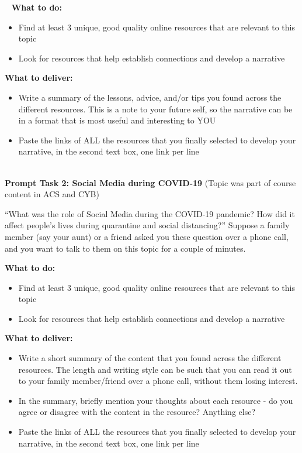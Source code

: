 \documentclass[letterpaper, nobind]{templates/ociamthesis}
\begin{document}
~
\textbf{What to do:}

\begin{itemize}
\item
  Find at least 3 unique, good quality online resources that are
  relevant to this topic
\item
  Look for resources that help establish connections and develop a
  narrative
\end{itemize}

\textbf{What to deliver:}

\begin{itemize}
\item
  Write a summary of the lessons, advice, and/or tips you found across
  the different resources. This is a note to your future self, so the
  narrative can be in a format that is most useful and interesting to
  YOU
\item
  Paste the links of ALL the resources that you finally selected to
  develop your narrative, in the second text box, one link per line
\end{itemize}

~\\
\textbf{Prompt Task 2: Social Media during COVID-19} (Topic was part of course
content in ACS and CYB)

``What was the role of Social Media during the COVID-19 pandemic? How did
it affect people's lives during quarantine and social distancing?''
Suppose a family member (say your aunt) or a friend asked you these
question over a phone call, and you want to talk to them on this topic
for a couple of minutes.

\textbf{What to do:}

\begin{itemize}
\item
  Find at least 3 unique, good quality online resources that are
  relevant to this topic
\item
  Look for resources that help establish connections and develop a
  narrative
\end{itemize}

\textbf{What to deliver:}

\begin{itemize}
\item
  Write a short summary of the content that you found across the
  different resources. The length and writing style can be such that
  you can read it out to your family member/friend over a phone call,
  without them losing interest.
\item
  In the summary, briefly mention your thoughts about each resource -
  do you agree or disagree with the content in the resource? Anything
  else?
\item
  Paste the links of ALL the resources that you finally selected to
  develop your narrative, in the second text box, one link per line
\end{itemize}
\end{document}
